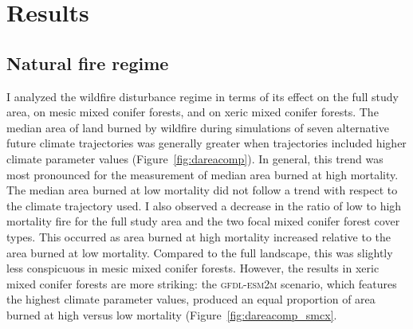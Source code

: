 \section{Results}

\subsection*{Natural fire regime}

I analyzed the wildfire disturbance regime in terms of its effect on the full study area, on mesic mixed conifer forests, and on xeric mixed conifer forests. 
%
The median area of land burned by wildfire during simulations of seven alternative future climate trajectories was generally greater when trajectories included higher climate parameter values (Figure~\ref{fig:dareacomp}). In general, this trend was most pronounced for the measurement of median area burned at high mortality. The median area burned at low mortality did not follow a trend with respect to the climate trajectory used. I also observed a decrease in the ratio of low to high mortality fire for the full study area and the two focal mixed conifer forest cover types. This occurred as area burned at high mortality increased relative to the area burned at low mortality. Compared to the full landscape, this was slightly less conspicuous in mesic mixed conifer forests. However, the results in xeric mixed conifer forests are more striking: the \textsc{gfdl-esm2m} scenario, which features the highest climate parameter values, produced an equal proportion of area burned at high versus low mortality (Figure~\ref{fig:dareacomp_smcx}.



